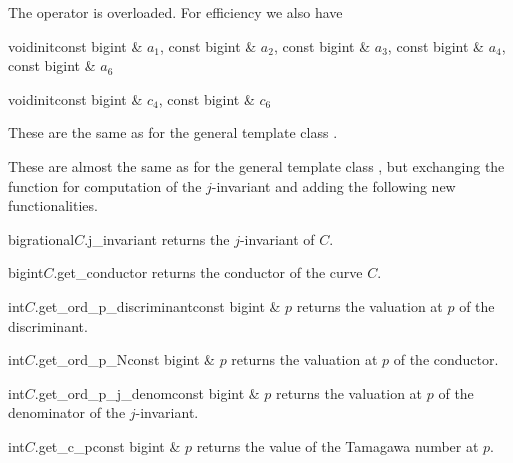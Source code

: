 \ASGN

The operator \code{=} is overloaded.  For efficiency we also have

\begin{fcode}{void}{init}{const bigint & $a_1$, const bigint & $a_2$,
    const bigint & $a_3$, const bigint & $a_4$, const bigint & $a_6$}%
\end{fcode}

\begin{fcode}{void}{init}{const bigint & $c_4$, const bigint & $c_6$}
\end{fcode}



\ACCS

These are the same as for the general template class .



\HIGH

These are almost the same as for the general template class , but
exchanging the function for computation of the $j$-invariant and adding the following new
functionalities.

\begin{cfcode}{bigrational}{$C$.j_invariant}{}
  returns the $j$-invariant of $C$. 
\end{cfcode}

\begin{cfcode}{bigint}{$C$.get_conductor}{}
  returns the conductor of the curve $C$.
\end{cfcode}

\begin{cfcode}{int}{$C$.get_ord_p_discriminant}{const bigint & $p$}
  returns the valuation at $p$ of the discriminant.
\end{cfcode}

\begin{cfcode}{int}{$C$.get_ord_p_N}{const bigint & $p$}
  returns the valuation at $p$ of the conductor.
\end{cfcode}

\begin{cfcode}{int}{$C$.get_ord_p_j_denom}{const bigint & $p$}
  returns the valuation at $p$ of the denominator of the $j$-invariant.
\end{cfcode}

\begin{cfcode}{int}{$C$.get_c_p}{const bigint & $p$}
  returns the value of the Tamagawa number at $p$.
\end{cfcode}

